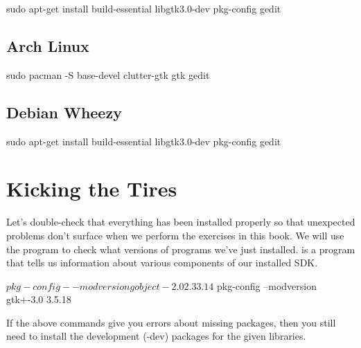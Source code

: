 \begin{Terminal}
sudo apt-get install build-essential libgtk3.0-dev pkg-config gedit
\end{Terminal}


\subsection{Arch Linux}
\begin{Terminal}
sudo pacman -S base-devel clutter-gtk gtk gedit
\end{Terminal}

\subsection{Debian Wheezy}

\begin{Terminal}
sudo apt-get install build-essential libgtk3.0-dev pkg-config gedit
\end{Terminal}


\section{Kicking the Tires}

Let's double-check that everything has been installed properly so that 
unexpected problems don't surface when we perform the exercises in this book.
We will use the  program to check what versions of programs
we've just installed.  is a program that tells us information
about various components of our installed SDK.

\begin{Terminal}
$ pkg-config --modversion gobject-2.0
2.33.14

$ pkg-config --modversion gtk+-3.0
3.5.18
\end{Terminal}

If the above commands give you errors about missing packages, then you still
need to install the development (-dev) packages for the given libraries.
